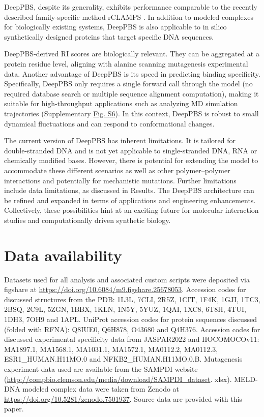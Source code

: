 \par
DeepPBS, despite its generality, exhibits performance comparable to the recently described family-specific method rCLAMPS \citep{Wetzel2022}. In addition to modeled complexes for biologically existing systems, DeepPBS is also applicable to in silico synthetically designed proteins that target specific DNA sequences.
\par
DeepPBS-derived RI scores are biologically relevant. They can be aggregated at a protein residue level, aligning with alanine scanning mutagenesis experimental data. Another advantage of DeepPBS is its speed in predicting binding specificity. Specifically, DeepPBS only requires a single forward call through the model (no required database search or multiple sequence alignment computation), making it suitable for high-throughput applications such as analyzing MD simulation trajectories (Supplementary \hyperref[fig:pdnaS6]{Fig. S6}). In this context, DeepPBS is robust to small dynamical fluctuations and can respond to conformational changes.
\par
The current version of DeepPBS has inherent limitations. It is tailored for double-stranded DNA and is not yet applicable to single-stranded DNA, RNA or chemically modified bases. However, there is potential for extending the model to accommodate these different scenarios as well as other polymer–polymer interactions and potentially for mechanistic mutations. Further limitations include data limitations, as discussed in Results. The DeepPBS architecture can be refined and expanded in terms of applications and engineering enhancements. Collectively, these possibilities hint at an exciting future for molecular interaction studies and computationally driven synthetic biology. 

\section{Data availability}
Datasets used for all analysis and associated custom scripts were deposited via figshare at \url{https://doi.org/10.6084/m9.figshare.25678053}. Accession codes for discussed structures from the PDB: 1L3L,
7CLI, 2R5Z, 1CIT, 1F4K, 1GJI, 1TC3, 2BSQ, 2C9L, 5ZGN, 1BBX, 1KLN,
1N5Y, 5YUZ, 1QAI, 1XC8, 6T8H, 4TUI, 1DH3, 7OH9 and 1APL. UniProt
accession codes for protein sequences discussed (folded with RFNA):
Q8IUE0, Q6H878, O43680 and Q4H376. Accession codes for discussed
experimental specificity data from JASPAR2022 and HOCOMOCOv11:
MA1897.1, MA1568.1, MA1031.1, MA1572.1, MA0112.2, MA0112.3,
ESR1\_HUMAN.H11MO.0 and NFKB2\_HUMAN.H11MO.0.B. Mutagenesis experiment data used are available from the SAMPDI website
(\url{http://compbio.clemson.edu/media/download/SAMPDI\_dataset}.
xlsx). MELD-DNA modeled complex data were taken from Zenodo
at \url{https://doi.org/10.5281/zenodo.7501937}. Source data are
provided with this paper.

